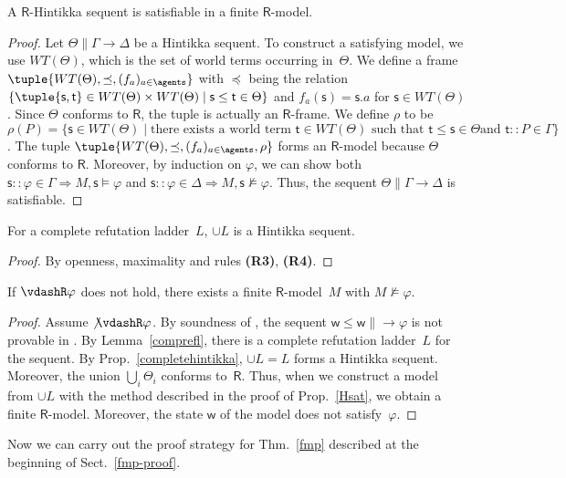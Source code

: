 \documentclass[doctor]{iscs-thesis}
\begin{document}
\begin{proposition}
 \label{Hsat}
 A $\mathsf R$-Hintikka sequent is satisfiable in a finite $\mathsf R$-model.
\end{proposition}
\begin{proof}
 \newcommand{\W}{WT(\Theta)}
 Let $\Theta\parallel \Gamma\longrightarrow\Delta$ be a Hintikka sequent.
 To construct a satisfying model, we use $\W$,
 which is the set of world
 terms occurring in~$\Theta$.
 We define a frame $\tuple{\W, \preceq, (f_a)_{a\in\agents}}$ with
 $\preceq$ being the relation $\{\tuple{\mathsf s,\mathsf t}\in
 \W\times \W\mid
 \mathsf s\le
 \mathsf t\in\Theta\}$ and
 $f_a(\mathsf s) = \mathsf s.a$ for $\mathsf s\in\W$\enspace.
 Since $\Theta$ conforms to $\mathsf R$, 
 the tuple is actually an $\mathsf R$-frame.
 We define $\rho$ to be $\rho(P) = 
 \{\mathsf s\in \W\mid
 \mbox{there exists a world term } \mathsf t \in \W \mbox{ such that }
 \mathsf t\le
 \mathsf s \in \Theta\mbox{
 and }\mathsf t::P\in \Gamma\}$.
 The tuple $\tuple{\W,\preceq,(f_a)_{a\in \agents},\rho}$ forms
 an $\mathsf R$-model because $\Theta$ conforms to $\mathsf R$.
 Moreover, by induction on $\varphi$, we can show both 
 $\mathsf s::\varphi\in\Gamma\Longrightarrow M,\mathsf s\models\varphi$
 and 
 $\mathsf s::\varphi\in\Delta\Longrightarrow M,\mathsf s\not\models\varphi$.
 Thus, the sequent $\Theta\parallel \Gamma\longrightarrow\Delta$ is satisfiable.
\end{proof}

\begin{proposition}
\label{completehintikka}
 For a complete refutation ladder~$L$,
$\cup L$ is a Hintikka sequent.
\end{proposition}
\begin{proof}
 By openness, maximality and rules \textbf{(R3)}, \textbf{(R4)}.
\end{proof}

\begin{lemma}
\label{R-fmp}
 If $\vdashR\varphi$  does not hold, there exists a finite $\mathsf
 R$-model~$M$ with $M\not\models\varphi$.
\end{lemma}
\begin{proof}
 Assume $\not\vdashR\varphi$.
 By soundness of \LB,
 the sequent $\mathsf w\le\mathsf w\parallel \longrightarrow\varphi$ is not
 provable in \LB.
 By Lemma~\ref{comprefl},
 there is a complete refutation ladder~$L$ for the sequent.
 By Prop.~\ref{completehintikka},
 $\cup L = L$  forms a Hintikka
 sequent.
 Moreover, 
 the union $\bigcup_i\Theta_i$ conforms to~$\mathsf
 R$.
 Thus, when we construct a model from $\cup L$ with the method described in
 the proof of Prop.~\ref{Hsat},
 we obtain a finite $\mathsf R$-model.
 Moreover, the state $\mathsf w$ of the model does not satisfy~$\varphi$.
\end{proof}
Now we can carry out the proof strategy for Thm.~\ref{fmp} described
at the beginning of Sect.~\ref{fmp-proof}.
\end{document}
